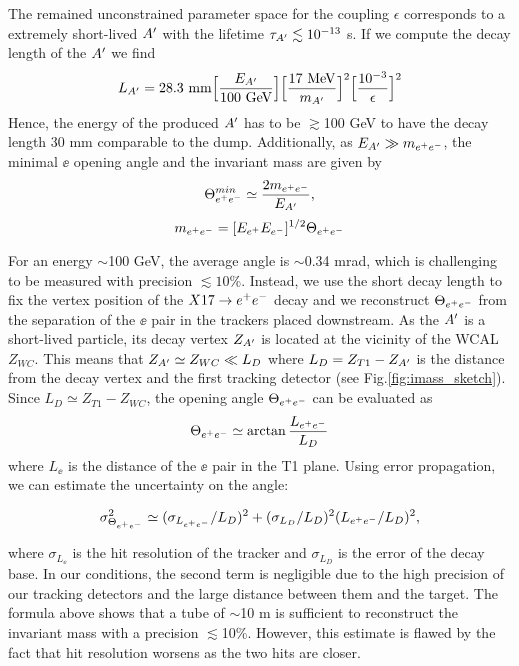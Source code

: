 The remained unconstrained parameter space for the coupling $\epsilon$  corresponds to a extremely short-lived $A'$ with the lifetime $\tau_{A'} \lesssim 10^{-13}$ s. If we compute the decay length of the $A'$ we find 
\begin{equation}
L_{A'} = 28.3 ~{\rm mm}  \Bigl[\frac{E_{A'}}{100~ \text{GeV}}\Bigr] \Bigl[\frac{17~ \text{MeV}}{m_{A'}}\Bigr]^2 \Bigl[\frac{10^{-3}}{\epsilon}\Bigr]^2
\label{eqn:length}
\end{equation}
Hence, the energy of the produced $A'$ has to be $\gtrsim$100 GeV to have the decay length 30 mm comparable to the dump.
Additionally, as $E_{A'} \gg m_{e^+e^-}$, the minimal $\ee$ opening angle and the invariant mass are given by
\begin{equation} 
\Theta_{ e^+e^-}^{min} \simeq  \frac{2m_{e^+e^-}}{E_{A'}},
\label{eqn:angle}
\end{equation}
\begin{equation}
m_{e^+e^-} = [E_{e^+} E_{e^-}]^{1/2} \Theta_{ e^+e^-}
\label{eqn:imass}
\end{equation}

For an energy $\sim$100 GeV, the average angle is $\sim$0.34 mrad, which is challenging to be measured with precision $\lesssim 10\%$. Instead, we use the short decay length to fix the vertex position of the $X17 \rightarrow e^+ e^-$ decay and we reconstruct $\Theta_{ e^+e^-}$ from the separation of the $\ee$ pair in the trackers placed downstream. As the $A'$ is a short-lived particle, its decay vertex $Z_{A'}$ is located at the vicinity of the WCAL $Z_{WC}$. This means that $Z_{A'} \simeq Z_{WC} \ll L_D$ where $L_D=Z_{T1}-Z_{A'}$ is the distance from the decay vertex and the first tracking detector (see Fig.\ref{fig:imass_sketch}). Since $L_D \simeq Z_{T1} - Z_{WC}$, the opening angle $\Theta_{ e^+e^-}$ can be evaluated as 
\begin{equation}
\Theta_{ e^+e^-} \simeq \arctan{\frac{ L_{e^+e^-}}{L_D}}
\label{angle-est}
\end{equation}
where $L_{\ee}$ is the distance of the $\ee$ pair in the T1 plane. Using error propagation, we can estimate the uncertainty on the angle:

\begin{equation}
  \sigma^2_{\Theta_{ e^+e^-}} \simeq (\sigma_{L_{e^+e^-}}  / L_D)^2 + (\sigma_{L_D} / L_D)^2(L_{e^+e^-} / L_D)^2,
  \label{eqn:thetaerr}
\end{equation}

where $\sigma_{L_{\ee}}$ is the hit resolution of the tracker and $\sigma_{L_D}$ is the error of the decay base. In our conditions, the second term is negligible due to the high precision of our tracking detectors and the large distance between them and the target. The formula above shows that a tube of $\sim$10 m is sufficient to reconstruct the invariant mass with a precision $\lesssim$10\%. However, this estimate is flawed by the fact that hit resolution worsens as the two hits are closer.

